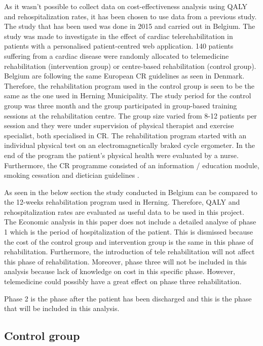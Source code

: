 As it wasn’t possible to collect data on cost-effectiveness analysis using QALY and rehospitalization rates, it has been chosen to use data from a previous study. The study that has been used was done in 2015 and carried out in Belgium. The study was made to investigate in the effect of cardiac telerehabilitation in patients with a personalised patient-centred web application. 140 patients suffering from a cardiac disease were randomly allocated to telemedicine rehabilitation (intervention group) or centre-based rehabilitation (control group). Belgium are following the same European CR guidelines as seen in Denmark. Therefore, the rehabilitation program used in the control group is seen to be the same as the one used in Herning Municipality. The study period for the control group was three month and the group participated in group-based training sessions at the rehabilitation centre. The group size varied from 8-12 patients per session and they were under supervision of physical therapist and exercise specialist, both specialised in CR. The rehabilitation program started with an individual physical test on an electromagnetically braked cycle ergometer. In the end of the program the patient’s physical health were evaluated by a nurse. Furthermore, the CR programme consisted of an information / education module, smoking cessation and dietician guidelines \cite{costeffect}. 

As seen in the below section the study conducted in Belgium can be compared to the 12-weeks rehabilitation program used in Herning. Therefore, QALY and rehospitalization rates are evaluated as useful data to be used in this project. \\


The Economic analysis in this paper does not include a detailed analyse of phase 1 which is the period of hospitalization of the patient. This is dismissed because the cost of the control group and intervention group is the same in this phase of rehabilitation. Furthermore, the introduction of tele rehabilitation will not affect this phase of rehabilitation. Moreover, phase three will not be included in this analysis because lack of knowledge on cost in this specific phase. However,  telemedicine could possibly have a great effect on phase three rehabilitation.  

Phase 2 is the phase after the patient has been discharged and this is the phase that will be included in this analysis.


\subsection{Control group}


